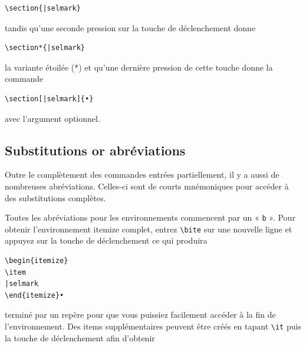 \documentclass[11pt,french]{article}
\newcommand{\cmd}[1]{\textsf{#1}}
\begin{document}
\begin{verbatim}
\section{|selmark}
\end{verbatim}
tandis qu'une seconde pression sur la touche de déclenchement donne
\begin{verbatim}
\section*{|selmark}
\end{verbatim}
la variante étoilée (*) et qu'une dernière pression de cette touche donne la commande
\begin{verbatim}
\section[|selmark]{•}
\end{verbatim}
avec l'argument optionnel.

\subsection{Substitutions or abréviations}

Outre le complètement des commandes entrées partiellement, il y a aussi de nombreuses abréviations. Celles-ci sont de courts mnémoniques pour accéder à des substitutions complètes.

Toutes les abréviations pour les environnements commencent par un « \texttt{b} ». Pour obtenir l'environnement  \cmd{itemize} complet, entrez \verb|\bite| sur une nouvelle ligne et appuyez sur la touche de déclenchement ce qui produira

%
\begin{verbatim}
\begin{itemize}
\item
|selmark
\end{itemize}•
\end{verbatim}
terminé par un repère pour que vous puissiez facilement accéder à la fin de l'environnement. Des items supplémentaires peuvent être créés en tapant \verb|\it| puis la touche de déclenchement afin d'obtenir
\end{document}

